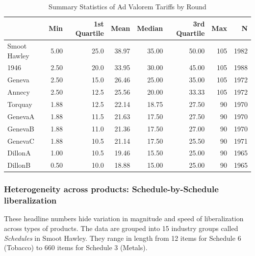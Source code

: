 \documentclass[
  12pt,
]{article}
\begin{document}
\begin{table}[!h]

\caption{\label{tab:av-sm-db}Summary Statistics of Ad Valorem Tariffs by Round}
\centering
\begin{tabular}[t]{lrrrrrrr}
\toprule
  & Min & 1st Quartile & Mean & Median & 3rd Quartile & Max & N\\
\midrule
Smoot Hawley & 5.00 & 25.0 & 38.97 & 35.00 & 50.00 & 105 & 1982\\
1946 & 2.50 & 20.0 & 33.95 & 30.00 & 45.00 & 105 & 1988\\
Geneva & 2.50 & 15.0 & 26.46 & 25.00 & 35.00 & 105 & 1972\\
Annecy & 2.50 & 12.5 & 25.56 & 20.00 & 33.33 & 105 & 1972\\
Torquay & 1.88 & 12.5 & 22.14 & 18.75 & 27.50 & 90 & 1970\\
\addlinespace
GenevaA & 1.88 & 11.5 & 21.63 & 17.50 & 27.50 & 90 & 1970\\
GenevaB & 1.88 & 11.0 & 21.36 & 17.50 & 27.00 & 90 & 1970\\
GenevaC & 1.88 & 10.5 & 21.14 & 17.50 & 25.50 & 90 & 1971\\
DillonA & 1.00 & 10.5 & 19.46 & 15.50 & 25.00 & 90 & 1965\\
DillonB & 0.50 & 10.0 & 18.88 & 15.00 & 25.00 & 90 & 1965\\
\bottomrule
\end{tabular}
\end{table}

\hypertarget{sched}{%
\subsubsection{Heterogeneity across products: Schedule-by-Schedule liberalization}\label{sched}}

These headline numbers hide variation in magnitude and speed of liberalization across types of products. The data are grouped into 15 industry groups called \emph{Schedules} in Smoot Hawley. They range in length from 12 items for Schedule 6 (Tobacco) to 660 items for Schedule 3 (Metals).
\end{document}
